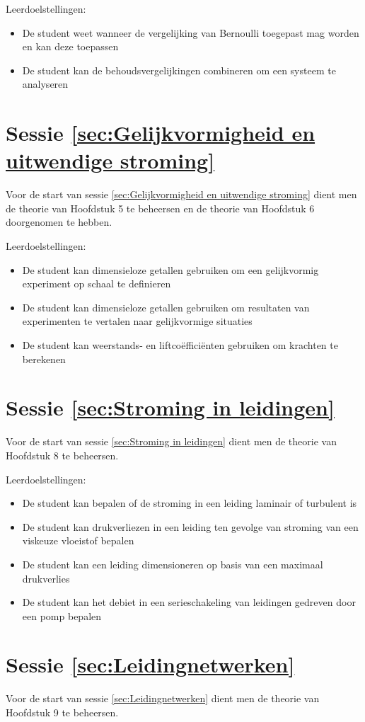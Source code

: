 Leerdoelstellingen:
\begin{itemize}
	\item De student weet wanneer de vergelijking van Bernoulli toegepast mag worden en kan deze toepassen
	\item De student kan de behoudsvergelijkingen combineren om een systeem te analyseren
\end{itemize}

	\section*{Sessie \ref{sec:Gelijkvormigheid en uitwendige stroming}}
Voor de start van sessie \ref{sec:Gelijkvormigheid en uitwendige stroming} dient men de theorie van Hoofdstuk 5 te beheersen en de theorie van Hoofdstuk 6 doorgenomen te hebben.

Leerdoelstellingen:
\begin{itemize}
	\item De student kan dimensieloze getallen gebruiken om een gelijkvormig experiment op schaal te definieren
	\item De student kan dimensieloze getallen gebruiken om resultaten van experimenten te vertalen naar gelijkvormige situaties
	\item De student kan weerstands- en liftcoëfficiënten gebruiken om krachten te berekenen
\end{itemize}

	\section*{Sessie \ref{sec:Stroming in leidingen}}
Voor de start van sessie \ref{sec:Stroming in leidingen} dient men de theorie van Hoofdstuk 8 te beheersen.

Leerdoelstellingen:
\begin{itemize}
	\item De student kan bepalen of de stroming in een leiding laminair of turbulent is
	\item De student kan drukverliezen in een leiding ten gevolge van stroming van een viskeuze vloeistof bepalen
	\item De student kan een leiding dimensioneren op basis van een maximaal drukverlies
	\item De student kan het debiet in een serieschakeling van leidingen gedreven door een pomp bepalen
\end{itemize}

	\section*{Sessie \ref{sec:Leidingnetwerken}}
Voor de start van sessie \ref{sec:Leidingnetwerken} dient men de theorie van Hoofdstuk 9 te beheersen.

